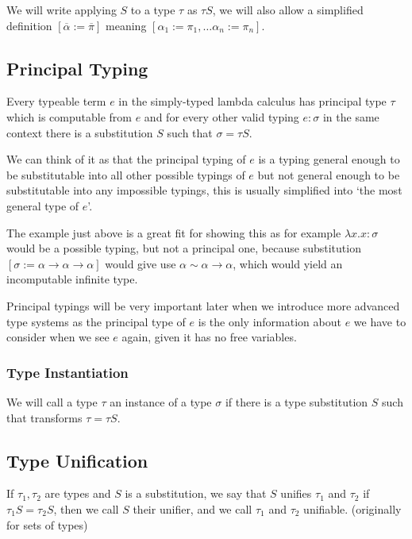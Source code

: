 We will write applying $S$ to a type $\tau$ as $\tau S$, we will also allow a simplified definition $[\overline{\alpha} := \overline{\pi}]$ meaning $[\alpha_1 := \pi_1, \dots \alpha_n := \pi_n]$.

\subsection{Principal Typing}

Every typeable term $e$ in the simply-typed lambda calculus has principal type $\tau$ \cite{barendregt1992lambda} which is computable from $e$ and for every other valid typing $e : \sigma$ in the same context there is a substitution $S$ such that $\sigma = \tau S$.

We can think of it as that the principal typing of $e$ is a typing general enough to be substitutable into all other possible typings of $e$ but not general enough to be substitutable into any impossible typings, this is usually simplified into `the most general type of $e$'.

The example just above is a great fit for showing this as for example $\lambda x . x : \sigma$ would be a possible typing, but not a principal one, because substitution $[\sigma := \alpha \rightarrow \alpha \rightarrow \alpha]$ would give use $\alpha \sim \alpha \rightarrow \alpha$, which would yield an incomputable infinite type.

Principal typings will be very important later when we introduce more advanced type systems as the principal type of $e$ is the only information about $e$ we have to consider when we see $e$ again, given it has no free variables.

\subsubsection{Type Instantiation}

We will call a type $\tau$ an instance of a type $\sigma$ if there is a type substitution $S$ such that transforms $\tau = \tau S$.

\subsection{Type Unification}

If $\tau_1, \tau_2$ are types and $S$ is a substitution, we say that $S$ unifies $\tau_1$ and $\tau_2$ if $\tau_1 S = \tau_2 S$, then we call $S$ their unifier, and we call $\tau_1$ and $\tau_2$ unifiable. \cite{robinson1965machine} (originally for sets of types)

